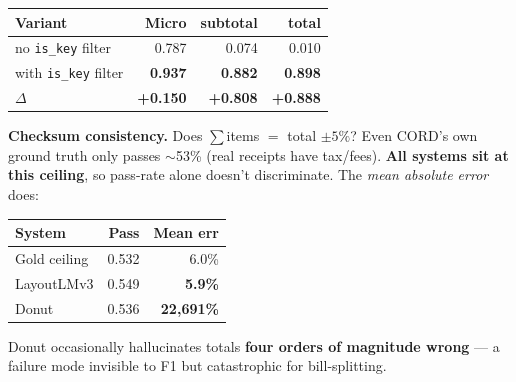 \documentclass[landscape,a0paper,fontscale=0.285]{baposter}
\begin{document}
\begin{poster}
{\begin{minipage}{0.5\textwidth}
\smallskip
\centering
\begin{tabular}{lrrr}
\toprule
\textbf{Variant}            & \textbf{Micro} & \textbf{subtotal} & \textbf{total} \\
\midrule
no \texttt{is\_key} filter  & 0.787 & 0.074 & 0.010 \\
\rowcolor{wingreen}with \texttt{is\_key} filter & \textbf{0.937} & \textbf{0.882} & \textbf{0.898} \\
\midrule
$\Delta$                    & \textbf{+0.150} & \textbf{+0.808} & \textbf{+0.888} \\
\bottomrule
\end{tabular}
\end{minipage}
\hfill
\begin{minipage}{0.46\textwidth}
\textbf{Checksum consistency.} Does $\sum$items $=$ total $\pm 5\%$? Even CORD's own
ground truth only passes $\sim$53\% (real receipts have tax/fees). \textbf{All systems
sit at this ceiling}, so pass-rate alone doesn't discriminate. The
\emph{mean absolute error} does:

\smallskip
\centering
\begin{tabular}{lrr}
\toprule
\textbf{System} & \textbf{Pass} & \textbf{Mean err} \\
\midrule
Gold ceiling  & 0.532 & 6.0\% \\
\rowcolor{wingreen}LayoutLMv3 & 0.549 & \textbf{5.9\%} \\
\rowcolor{lossred}Donut      & 0.536 & \textbf{22{,}691\%} \\
\bottomrule
\end{tabular}

\smallskip
\raggedright
Donut occasionally hallucinates totals \textbf{four orders of magnitude wrong} — a
failure mode invisible to F1 but catastrophic for bill-splitting.
\end{minipage}
}


\end{poster}
\end{document}
